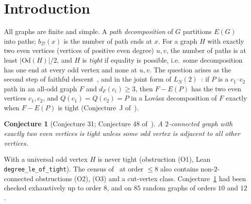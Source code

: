 \documentclass[11pt]{amsart}
\newtheorem{conjecture}[theorem]{Conjecture}
\theoremstyle{definition}
\newcommand{\Od}{\mathrm{Od}}
\begin{document}
\maketitle

\section{Introduction}\label{sec:intro}

All graphs are finite and simple. A \emph{path decomposition} of $G$ partitions $E(G)$ into paths;
$b_\mathcal D(x)$ is the number of path ends at $x$. For a graph $H$ with exactly two even vertices
(vertices of positive even degree) $u,v$, the number of paths is at least $|\Od(H)|/2$, and $H$ is
\emph{tight} if equality is possible, i.e.\ some decomposition has one end at every odd vertex and none
at $u,v$. The question arises as the second step of faithful descent~\cite[\S6]{EP}, and in the joint form
of $L_N(2)$~\cite{CR}: if $P$ is a $c_1$--$c_2$ path in an all-odd graph $F$ and $d_F(c_i)\ge3$, then $F-E(P)$
has the two even vertices $c_1,c_2$, and $Q(c_1)=Q(c_2)=P$ in a Lov\'asz decomposition of $F$ exactly when $F-E(P)$ is
tight (Conjecture~J of~\cite{CR}).

\begin{conjecture}[Conjecture 31; Conjecture 48 of~\cite{EP}]\label{conj:31}
A $2$-connected graph with exactly two even vertices is tight unless some odd vertex is adjacent to all
other vertices.
\end{conjecture}

With a universal odd vertex $H$ is never tight (obstruction (O1), Lean \texttt{degree\_le\_of\_tight}).
The census of~\cite{EP} at order $\le 8$ also contains non-$2$-connected obstructions (O2), (O3) and a
cut-vertex class. Conjecture~\ref{conj:31} had been checked exhaustively up to order $8$, and on $85$ random
graphs of orders $10$ and $12$.
\end{document}
